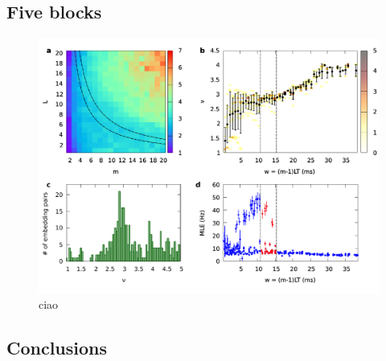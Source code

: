 \documentclass[a4paper,11pt,aps,secnumarabic,balancelastpage,amsmath,amssymb,floatfix,table]{article}
\begin{document}
\subsection{Five blocks}

\begin{figure}[H]
    \centering
    \includegraphics[width=\linewidth]{../5_blocks/4e4_points/plots/chaos.pdf}
    \caption{ciao}
    \label{fig:5 blocks chaos}
\end{figure}

\subsection{Conclusions}
\end{document}
